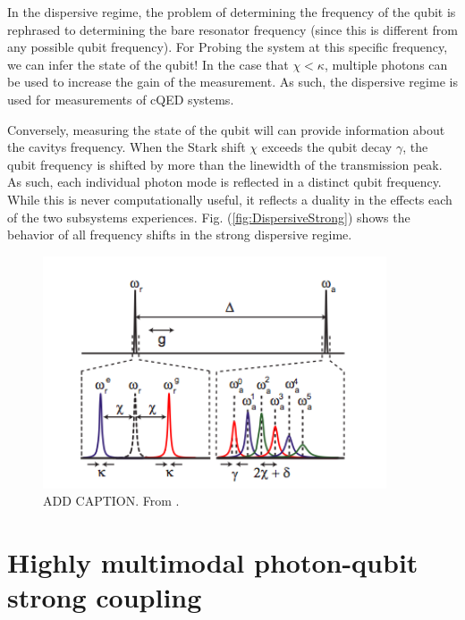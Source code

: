 \documentclass[12 pt]{book}
\begin{document}
In the dispersive regime, the problem of determining the frequency of the qubit is rephrased to determining the bare resonator frequency (since this is different from any possible qubit frequency). For  Probing the system at this specific frequency, we can infer the state of the qubit! In the case that $\chi<\kappa$, multiple photons can be used to increase the gain of the measurement. As such, the dispersive regime is used for measurements of cQED systems. 

Conversely, measuring the state of the qubit will can provide information about the cavitys frequency. When the Stark shift $\chi$ exceeds the qubit decay $\gamma$, the qubit frequency is shifted by more than the linewidth of the transmission peak. As such, each individual photon mode is reflected in a distinct qubit frequency. While this is never computationally useful, it reflects a duality in the effects each of the two subsystems experiences. Fig. (\ref{fig:DispersiveStrong}) shows the behavior of all frequency shifts in the strong dispersive regime. 

\begin{figure}[h] 
   \centering
   \includegraphics[width=4in]{SchusterDispersiveFrequencyShifts.png} 
   \caption{ADD CAPTION. From \cite{Schuster}.}
   \label{fig:DispersiveFrequencyShifts}
\end{figure}

\chapter{Highly multimodal photon-qubit strong coupling}\label{chap:Multimodal}
\end{document}
